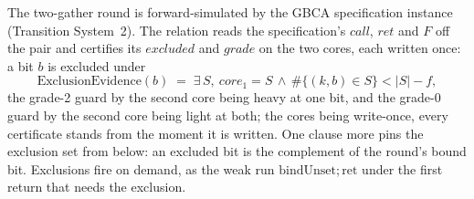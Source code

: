 \begin{theorem}
  \label{thm:gbca-pair-refines}
  \leanok
  The two-gather round is forward-simulated by the GBCA specification instance (Transition System~2).
  The relation reads the specification's $call$, $ret$ and $F$ off the pair and certifies its $excluded$ and $grade$ on the two cores, each written once: a bit $b$ is excluded under
  \[
    \mathrm{ExclusionEvidence}(b) \;=\; \exists\, S,\ core_1 = S \,\wedge\, \#\{(k, b) \in S\} < |S| - f,
  \]
  the grade-2 guard by the second core being heavy at one bit, and the grade-0 guard by the second core being light at both; the cores being write-once, every certificate stands from the moment it is written.
  One clause more pins the exclusion set from below: an excluded bit is the complement of the round's bound bit.
  Exclusions fire on demand, as the weak run $\mathrm{bindUnset}; \mathrm{ret}$ under the first return that needs the exclusion.
\end{theorem}

